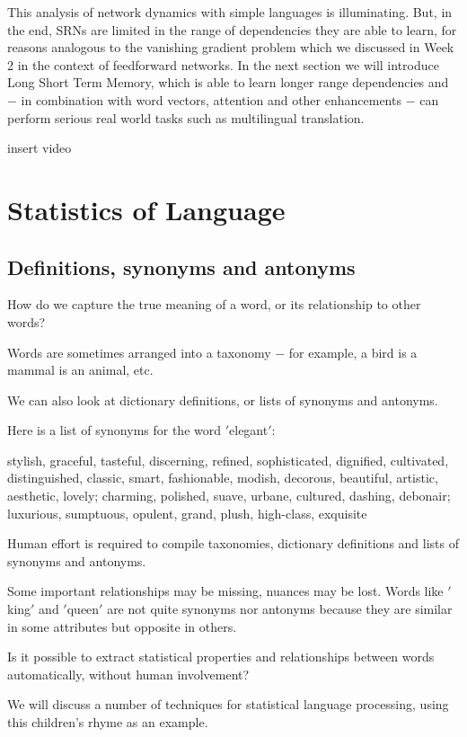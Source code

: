 \documentclass[11pt]{article}
\begin{document}
This analysis of network dynamics with simple languages is illuminating.
But, in the end, SRNs are limited in the range of dependencies they are able to
learn, for reasons analogous to the vanishing gradient problem which we
discussed in Week 2 in the context of feedforward networks.
In the next section we will introduce Long Short Term Memory, which is able to
learn longer range dependencies and $-$ in combination with word vectors,
attention and other enhancements $-$ can perform serious real world tasks such
as multilingual translation.

insert video

\section{Statistics of Language}\label{sec:statistics-of-language}
\subsection{Definitions, synonyms and antonyms}\label{subsec:definitions-synonyms-and-antonyms}

How do we capture the true meaning of a word, or its relationship to other
words?

Words are sometimes arranged into a taxonomy $-$ for example, a bird is a
mammal is an animal, etc.

We can also look at dictionary definitions, or lists of synonyms and antonyms.

Here is a list of synonyms for the word \('\)elegant\('\):

    stylish, graceful, tasteful, discerning, refined, sophisticated, dignified, cultivated, distinguished, classic, smart, fashionable, modish, decorous, beautiful, artistic, aesthetic, lovely; charming, polished, suave, urbane, cultured, dashing, debonair; luxurious, sumptuous, opulent, grand, plush, high-class, exquisite

Human effort is required to compile taxonomies, dictionary definitions and
lists of synonyms and antonyms.

Some important relationships may be missing, nuances may be lost.
Words like \('\)king\('\) and \('\)queen\('\) are not quite synonyms nor
antonyms because they are similar in some attributes but opposite in others.

Is it possible to extract statistical properties and relationships between
words automatically, without human involvement?

We will discuss a number of techniques for statistical language processing,
using this children's rhyme as an example.
\end{document}
